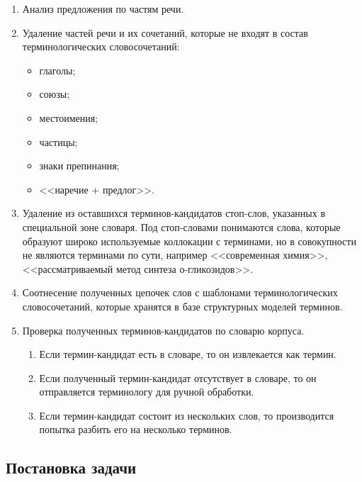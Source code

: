 \begin{enumerate}[label*=\arabic*.]
	\item Анализ предложения по частям речи.
	\item Удаление частей речи и их сочетаний, которые не входят в состав терминологических словосочетаний:
	
	\begin{itemize}[label*=---]
		\item глаголы;
		\item союзы;
		\item местоимения;
		\item частицы;
		\item знаки препинания;
		\item <<наречие + предлог>>.
		
	\end{itemize}
	
	\item Удаление из оставшихся терминов-кандидатов стоп-слов, указанных в специальной зоне словаря. Под стоп-словами понимаются слова, которые образуют широко используемые коллокации с терминами, но в совокупности не являются терминами по сути, например <<современная химия>>, <<рассматриваемый метод синтеза о-гликозидов>>.
	\item Соотнесение полученных цепочек слов с шаблонами терминологических словосочетаний, которые хранятся в базе структурных моделей терминов.
	\item Проверка полученных терминов-кандидатов по словарю корпуса.
	
	\begin{enumerate}[label*=\arabic*.]
		
	\item Если термин-кандидат есть в словаре, то он извлекается как термин.
	\item Если полученный термин-кандидат отсутствует в словаре, то он отправляется терминологу для ручной обработки.
	\item Если термин-кандидат состоит из нескольких слов, то производится попытка разбить его на несколько терминов.
	
	\end{enumerate}
	
\end{enumerate}



\subsection{Постановка задачи}

